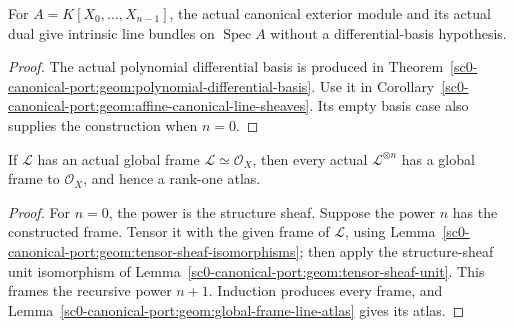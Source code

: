 \begin{corollary}
\label{sc0-canonical-port:geom:polynomial-canonical-line-sheaves}
\leanok
For \(A=K[X_0,\ldots,X_{n-1}]\), the actual canonical
exterior module and its actual dual give intrinsic line bundles
on \(\operatorname{Spec}A\) without a differential-basis
hypothesis.
\end{corollary}
\begin{proof}
The actual polynomial differential basis is produced in
Theorem~\ref{sc0-canonical-port:geom:polynomial-differential-basis}. Use it in
Corollary~\ref{sc0-canonical-port:geom:affine-canonical-line-sheaves}. Its empty
basis case also supplies the construction when \(n=0\).
\end{proof}

\begin{theorem}
\label{sc0-canonical-port:geom:globally-framed-tensor-powers}
\leanok
If \(\mathcal L\) has an actual global frame
\(\mathcal L\simeq\mathcal O_X\), then every actual
\(\mathcal L^{\otimes n}\) has a global frame to
\(\mathcal O_X\), and hence a rank-one atlas.
\end{theorem}
\begin{proof}
For \(n=0\), the power is the structure sheaf. Suppose the
power \(n\) has the constructed frame. Tensor it with the
given frame of \(\mathcal L\), using
Lemma~\ref{sc0-canonical-port:geom:tensor-sheaf-isomorphisms}; then apply the
structure-sheaf unit isomorphism of
Lemma~\ref{sc0-canonical-port:geom:tensor-sheaf-unit}. This frames the recursive
power \(n+1\). Induction produces every frame, and
Lemma~\ref{sc0-canonical-port:geom:global-frame-line-atlas} gives its atlas.
\end{proof}

